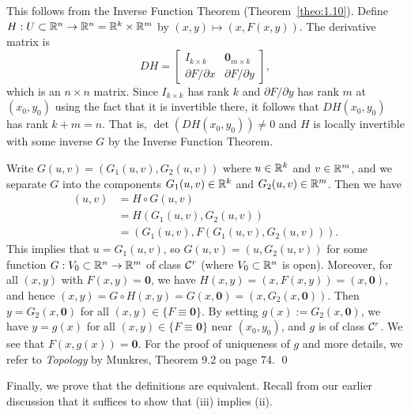 \begin{pf}
    This follows from the Inverse Function Theorem (Theorem~\ref{theo:1.10}).
    Define $H : U \subset \mathbb{R}^n \to \mathbb{R}^n = \mathbb{R}^k \times \mathbb{R}^m$ by $(x, y) 
    \mapsto (x, F(x, y))$. The derivative matrix is
    \[ DH = \left[ \begin{array}{c|c}
        I_{k\times k} & \mathbf 0_{m\times k} \\ \hline
        \partial F/\partial x & \partial F/\partial y
    \end{array} \right], \]
    which is an $n \times n$ matrix. 
    Since $I_{k\times k}$ has rank $k$ and $\partial F/\partial y$ has 
    rank $m$ at $(x_0, y_0)$ using the fact that it is invertible there, 
    it follows that $DH(x_0, y_0)$ has rank $k + m = n$. That is, 
    $\det(DH(x_0, y_0)) \neq 0$ and $H$ is locally invertible with 
    some inverse $G$ by the Inverse Function Theorem.

    Write $G(u, v) = (G_1(u, v), G_2(u, v))$ where $u \in \mathbb{R}^k$ and
    $v \in \mathbb{R}^m$, and we separate $G$ into the components $G_1(u, v) \in \mathbb{R}^k$ and 
    $G_2(u, v) \in \mathbb{R}^m$. Then we have 
    \begin{align*}
        (u, v) &= H \circ G(u, v) \\ 
        &= H(G_1(u, v), G_2(u, v)) \\ 
        &= (G_1(u, v), F(G_1(u, v), G_2(u, v))). 
    \end{align*}
    This implies that $u = G_1(u, v)$, so $G(u, v) = (u, G_2(u, v))$ for some 
    function $G : V_0 \subset \mathbb{R}^n \to \mathbb{R}^m$ of class ${\cal C}^r$ (where $V_0 
    \subset \mathbb{R}^n$ is open). Moreover, for all $(x, y)$ with $F(x, y) = \mathbf 0$, 
    we have $H(x, y) = (x, F(x, y)) = (x, \mathbf 0)$,
    and hence $(x, y) = G \circ H(x, y) = G(x, \mathbf 0) = (x, G_2(x, \mathbf 0))$. Then 
    $y = G_2(x, \mathbf 0)$ for all $(x, y) \in \{F \equiv \mathbf 0\}$. By setting 
    $g(x) := G_2(x, \mathbf 0)$, we have $y = g(x)$ for all $(x, y) \in \{F \equiv \mathbf 0\}$
    near $(x_0, y_0)$, and $g$ is of class ${\cal C}^r$. We see that 
    $F(x, g(x)) = \mathbf 0$.
    For the proof of uniqueness of $g$ and more details, we refer to 
    \emph{Topology} by Munkres, Theorem 9.2 on page 74. \qed 
\end{pf}\vspace{-0.25cm} 

Finally, we prove that the definitions are equivalent. Recall from 
our earlier discussion that it suffices to show that (iii) implies (ii). 

